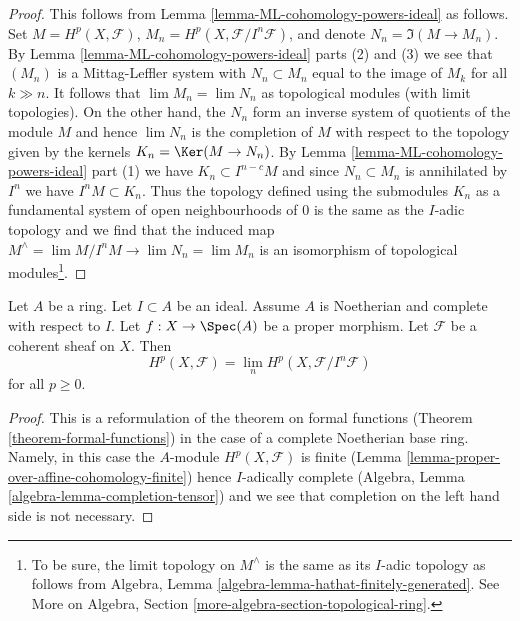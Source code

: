 \begin{proof}
This follows from Lemma \ref{lemma-ML-cohomology-powers-ideal} as follows.
Set $M = H^p(X, \mathcal{F})$, $M_n = H^p(X, \mathcal{F}/I^n\mathcal{F})$,
and denote $N_n = \Im(M \to M_n)$. By
Lemma \ref{lemma-ML-cohomology-powers-ideal} parts (2) and (3) we see that
$(M_n)$ is a Mittag-Leffler system with
$N_n \subset M_n$ equal to the image of $M_k$ for all $k \gg n$.
It follows that $\lim M_n = \lim N_n$ as topological modules (with limit
topologies). On the other hand, the $N_n$ form an inverse system of quotients
of the module $M$ and hence $\lim N_n$ is the completion of $M$
with respect to the topology given by the kernels $K_n = \Ker(M \to N_n)$.
By Lemma \ref{lemma-ML-cohomology-powers-ideal} part (1)
we have $K_n \subset I^{n - c}M$ and since $N_n \subset M_n$
is annihilated by $I^n$ we have $I^n M \subset K_n$.
Thus the topology defined using the submodules $K_n$
as a fundamental system of open neighbourhoods of $0$
is the same as the $I$-adic topology and we find that the
induced map $M^\wedge = \lim M/I^nM \to \lim N_n = \lim M_n$
is an isomorphism of topological modules\footnote{
To be sure, the limit topology on $M^\wedge$ is the same as its
$I$-adic topology as follows from
Algebra, Lemma \ref{algebra-lemma-hathat-finitely-generated}.
See More on Algebra, Section \ref{more-algebra-section-topological-ring}.}.
\end{proof}

\begin{lemma}
\label{lemma-spell-out-theorem-formal-functions}
Let $A$ be a ring. Let $I \subset A$ be an ideal. Assume $A$ is
Noetherian and complete with respect to $I$.
Let $f : X \to \Spec(A)$ be a proper morphism.
Let $\mathcal{F}$ be a coherent sheaf on $X$.
Then
$$
H^p(X, \mathcal{F}) = \lim_n H^p(X, \mathcal{F}/I^n\mathcal{F})
$$
for all $p \geq 0$.
\end{lemma}

\begin{proof}
This is a reformulation of the theorem on formal functions
(Theorem \ref{theorem-formal-functions}) in the
case of a complete Noetherian base ring. Namely, in this case the
$A$-module $H^p(X, \mathcal{F})$ is finite
(Lemma \ref{lemma-proper-over-affine-cohomology-finite}) hence
$I$-adically complete (Algebra, Lemma \ref{algebra-lemma-completion-tensor})
and we see that completion on the left hand side is not necessary.
\end{proof}

